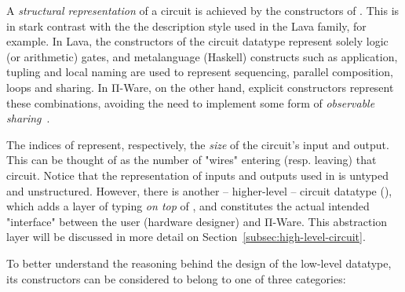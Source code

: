         A \emph{structural representation} of a circuit is achieved by the constructors of .
        This is in stark contrast with the the description style used in the Lava family, for example.
        In Lava, the constructors of the circuit datatype represent solely logic (or arithmetic) gates,
        and metalanguage (Haskell) constructs such as application, tupling and local naming are
        used to represent sequencing, parallel composition, loops and sharing.
        In Π-Ware, on the other hand, explicit constructors represent these combinations,
        avoiding the need to implement some form of \emph{observable sharing}~\cite{gill-typesafe-observable-sharing}.

        The indices of  represent, respectively, the \emph{size} of the circuit's input and output.
        This can be thought of as the number of "wires" entering (resp. leaving) that circuit.
        Notice that the representation of inputs and outputs used in  is untyped and unstructured.
        However, there is another -- higher-level -- circuit datatype (),
        which adds a layer of typing \emph{on top} of ,
        and constitutes the actual intended "interface" between the user (hardware designer) and Π-Ware.
        This abstraction layer will be discussed in more detail on Section~\ref{subsec:high-level-circuit}.

        To better understand the reasoning behind the design of the low-level  datatype,
        its constructors can be considered to belong to one of three categories:

